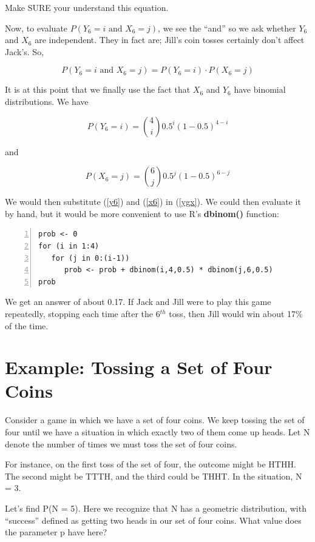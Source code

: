 Make SURE your understand this equation.

Now, to evaluate $P(Y_6 = i \textrm{ and } X_6 = j)$, we see the ``and''
so we ask whether $Y_6$ and $X_6$ are independent.  They in fact are;
Jill's coin tosses certainly don't affect Jack's.  So,

\begin{equation}
P(Y_6 = i \textrm{ and } X_6 = j) =
P(Y_6 = i) \cdot P(X_6 = j)
\end{equation}

It is at this point that we finally use the fact that $X_6$ and $Y_6$
have binomial distributions.  We have

\begin{equation}
\label{y6}
P(Y_6 = i) = \binom{4}{i} 0.5^i (1-0.5)^{4-i}  
\end{equation}

and

\begin{equation}
\label{x6}
P(X_6 = j) = \binom{6}{j} 0.5^j (1-0.5)^{6-j}  
\end{equation}

We would then substitute (\ref{y6}) and (\ref{x6}) in (\ref{ygx}).  We
could then evaluate it by hand, but it would be more convenient to use
R's {\bf dbinom()} function:

\begin{Verbatim}[fontsize=\relsize{-2},numbers=left]
prob <- 0
for (i in 1:4)
   for (j in 0:(i-1))
      prob <- prob + dbinom(i,4,0.5) * dbinom(j,6,0.5)
prob
\end{Verbatim}

We get an answer of about 0.17.  If Jack and Jill were to play this game
repeatedly, stopping each time after the 6$^{th}$ toss, then Jill
would win about 17\% of the time.

\section{Example:  Tossing a Set of Four Coins}

Consider a game in which we have a set of four coins.  We keep tossing
the set of four until we have a situation in which exactly two of them
come up heads.  Let N denote the number of times we must toss the set of
four coins.

For instance, on the first toss of the set of four, the outcome might be
HTHH.  The second might be TTTH, and the third could be THHT.  In the
situation, N = 3.

Let's find P(N = 5).  Here we recognize that N has a geometric
distribution, with ``success'' defined as getting two heads in our set
of four coins.  What value does the parameter p have here?  

